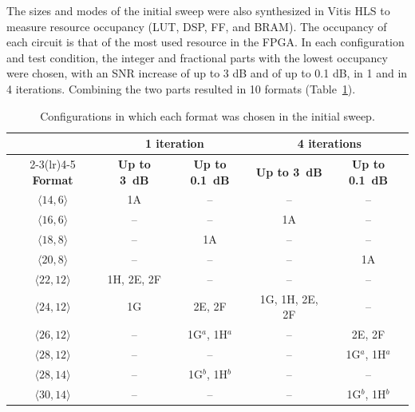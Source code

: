 The sizes and modes of the initial sweep were also synthesized in Vitis HLS to measure resource occupancy (LUT, DSP, FF, and BRAM). The occupancy of each circuit is that of the most used resource in the FPGA. In each configuration and test condition, the integer and fractional parts with the lowest occupancy were chosen, with an SNR increase of up to 3 dB and of up to 0.1 dB, in 1 and in 4 iterations. Combining the two parts resulted in 10 formats (Table~\ref{tab:formatos-origem}).


\begin{table}[htbp]
\caption{Configurations in which each format was chosen in the initial sweep.}
\label{tab:formatos-origem}
\vspace{4pt} %
\centering
\footnotesize
\renewcommand{\arraystretch}{1.2}
\begin{tabular}{ccccc}
\toprule
 & \multicolumn{2}{c}{\textbf{1 iteration}} & \multicolumn{2}{c}{\textbf{4 iterations}} \\
\cmidrule(lr){2-3}\cmidrule(lr){4-5}
\textbf{Format} & \textbf{Up to 3~dB} & \textbf{Up to 0.1~dB} & \textbf{Up to 3~dB} & \textbf{Up to 0.1~dB} \\
\midrule
$\langle 14,6\rangle$  & 1A         & --                       & --             & --                       \\
$\langle 16,6\rangle$  & --         & --                       & 1A             & --                       \\
$\langle 18,8\rangle$  & --         & 1A                       & --             & --                       \\
$\langle 20,8\rangle$  & --         & --                       & --             & 1A                       \\
$\langle 22,12\rangle$ & 1H, 2E, 2F & --                       & --             & --                       \\
$\langle 24,12\rangle$ & 1G         & 2E, 2F                   & 1G, 1H, 2E, 2F & --                       \\
$\langle 26,12\rangle$ & --         & 1G$^{a}$, 1H$^{a}$       & --             & 2E, 2F                   \\
$\langle 28,12\rangle$ & --         & --                       & --             & 1G$^{a}$, 1H$^{a}$       \\
$\langle 28,14\rangle$ & --         & 1G$^{b}$, 1H$^{b}$       & --             & --                       \\
$\langle 30,14\rangle$ & --         & --                       & --             & 1G$^{b}$, 1H$^{b}$       \\
\bottomrule
\end{tabular}
\vspace{4pt}
\end{table}



